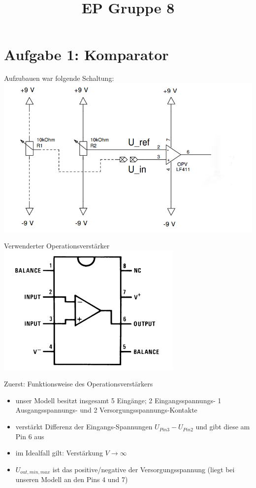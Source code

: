 \documentclass[compress,11pt]{beamer}
\title{EP Gruppe 8}
\begin{document}
\begin{frame}

\end{frame}

\section{Aufgabe 1: Komparator}
\begin{frame}
Aufzubauen war folgende Schaltung:
\includegraphics[width=.7\textwidth]{schalt/schalt11}
\end{frame}

\begin{frame}Verwenderter Operationsverstärker
\includegraphics[width=.7\textwidth]{schalt/opamp_innen}
\end{frame}

\begin{frame}
\begin{block}{Zuerst: Funktionsweise des Operationsverstärkers}
\begin{itemize}
\item unser Modell besitzt insgesamt 5 Eingänge; 2 Eingangsspannungs- 1 Ausgangsspannungs- und 2 Versorgungsspannungs-Kontakte
\item verstärkt Differenz der Eingangs-Spannungen $U_{Pin3} - U_{Pin2}$ und gibt diese am Pin 6 aus
\item im Idealfall gilt: Verstärkung $V \rightarrow \infty$
\item $U_{out,min,max}$ ist das positive/negative der Versorgungsspannung (liegt bei unseren Modell an den Pins 4 und 7)
\end{itemize}

\end{block}
\end{frame}
\end{document}
